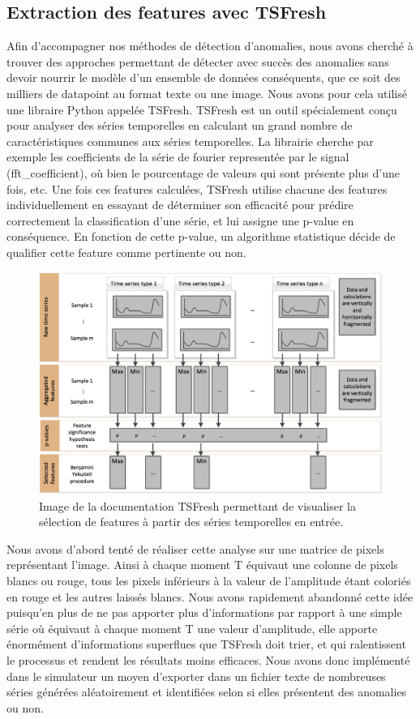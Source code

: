 \documentclass[french]{article}
\theoremstyle{mytheoremstyle}
\theoremstyle{mytheoremstyle}
\theoremstyle{myproblemstyle}
\begin{document}
        \subsection{Extraction des features avec TSFresh}
        Afin d'accompagner nos méthodes de détection d'anomalies, nous avons cherché à trouver des approches permettant de détecter avec succès des anomalies sans devoir nourrir le modèle d'un ensemble de données conséquents, que ce soit des milliers de datapoint au format texte ou une image.
        Nous avons pour cela utilisé une libraire Python appelée TSFresh. TSFresh est un outil spécialement conçu pour analyser des séries temporelles en calculant un grand nombre de caractéristiques communes aux séries temporelles\cite{tsfreshfeatures}. La librairie cherche par exemple les coefficients de la série de fourier representée par le signal (fft\_coefficient), où bien le pourcentage de valeurs qui sont présente plus d'une fois, etc. Une fois ces features calculées, TSFresh utilise chacune des features individuellement en essayant de déterminer son efficacité pour prédire correctement la classification d'une série, et lui assigne une p-value en conséquence. En fonction de cette p-value, un algorithme statistique décide de qualifier cette feature comme pertinente ou non.
        
        \begin{figure}[H]
            \centering
            \includegraphics[width=.8\textwidth]{images/features_extraction.png}
            \caption{Image de la documentation TSFresh permettant de visualiser la sélection de features à partir des séries temporelles en entrée.}
            \label{}
        \end{figure}
        
        
        Nous avons d'abord tenté de réaliser cette analyse sur une matrice de pixels représentant l'image. Ainsi à chaque moment T équivaut une colonne de pixels blancs ou rouge, tous les pixels inférieurs à la valeur de l'amplitude étant coloriés en rouge et les autres laissés blancs. Nous avons rapidement abandonné cette idée puisqu'en plus de ne pas apporter plus d'informations par rapport à une simple série où équivaut à chaque moment T une valeur d'amplitude, elle apporte énormément d'informations superflues que TSFresh doit trier, et qui ralentissent le processus et rendent les résultats moins efficaces. Nous avons donc implémenté dans le simulateur un moyen d'exporter dans un fichier texte de nombreuses séries générées aléatoirement et identifiées selon si elles présentent des anomalies ou non.
        
\end{document}
